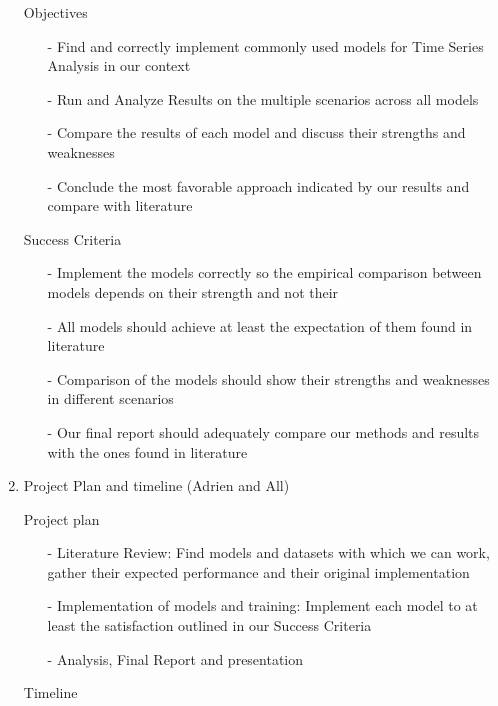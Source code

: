\documentclass[12pt, letterpaper]{article}
\begin{document}
\begin{enumerate}
        Objectives
        \begin{itemize}
            \item[-] Find and correctly implement commonly used models for Time Series Analysis in our context
            \item[-] Run and Analyze Results on the multiple scenarios across all models
            \item[-] Compare the results of each model and discuss their strengths and weaknesses
            \item[-] Conclude the most favorable approach indicated by our results and compare with literature
        \end{itemize} 
        Success Criteria
        \begin{itemize}
            \item [-] Implement the models correctly so the empirical comparison between models depends on their strength and not their
            \item [-] All models should achieve at least the expectation of them found in literature
            \item [-] Comparison of the models should show their strengths and weaknesses in different scenarios
            \item [-] Our final report should adequately compare our methods and results with the ones found in literature
        \end{itemize}
        
    \item Project Plan and timeline (Adrien and All)
        
        Project plan
        \begin{itemize}
            \item [-] Literature Review: Find models and datasets with which we can work, gather their expected performance and their original implementation
            \item [-] Implementation of models and training: Implement each model to at least the satisfaction outlined in our Success Criteria
            \item [-] Analysis, Final Report and presentation
        \end{itemize}
    
        Timeline
        
\end{enumerate}
\end{document}
